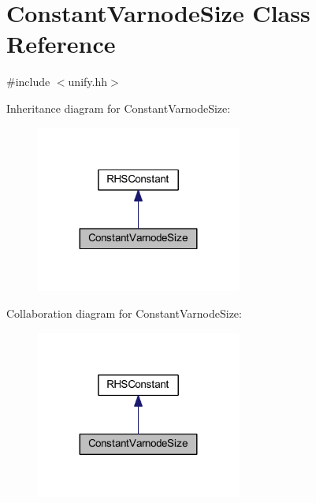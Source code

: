 \hypertarget{class_constant_varnode_size}{}\section{Constant\+Varnode\+Size Class Reference}
\label{class_constant_varnode_size}


{\ttfamily \#include $<$unify.\+hh$>$}



Inheritance diagram for Constant\+Varnode\+Size\+:
\nopagebreak
\begin{figure}[H]
\begin{center}
\leavevmode
\includegraphics[width=191pt]{class_constant_varnode_size__inherit__graph}
\end{center}
\end{figure}


Collaboration diagram for Constant\+Varnode\+Size\+:
\nopagebreak
\begin{figure}[H]
\begin{center}
\leavevmode
\includegraphics[width=191pt]{class_constant_varnode_size__coll__graph}
\end{center}
\end{figure}
